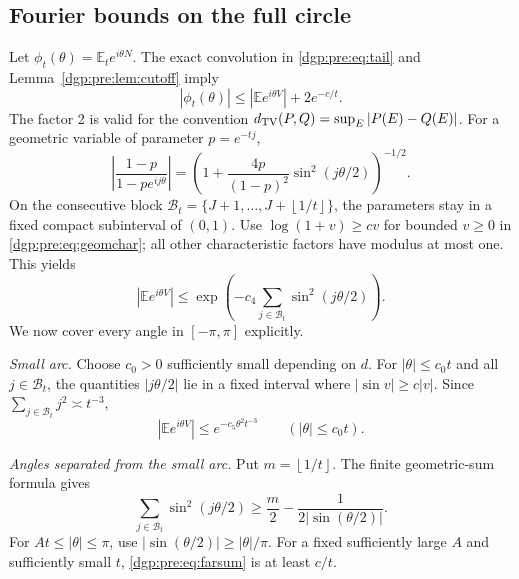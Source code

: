 \documentclass[11pt,letterpaper]{article}
\numberwithin{equation}{section}
\theoremstyle{remark}\newtheorem{remark}[theorem]{Remark}
\newcommand{\EE}{\mathbb E}
\newcommand{\floor}[1]{\left\lfloor #1\right\rfloor}
\begin{document}
\subsection{Fourier bounds on the full circle}
Let $\phi_t(\theta)=\EE_t e^{i\theta N}$. The exact convolution in
\eqref{dgp:pre:eq:tail} and Lemma~\ref{dgp:pre:lem:cutoff} imply
\begin{equation}
 |\phi_t(\theta)|\leq|\EE e^{i\theta V}|+2e^{-c/t}.
 \label{dgp:pre:eq:phicutoff}
\end{equation}
The factor 2 is valid for the convention
$d_{\rm TV}(P,Q)=\sup_E|P(E)-Q(E)|$.
For a geometric variable of parameter $p=e^{-tj}$,
\begin{equation}
 \left|\frac{1-p}{1-pe^{ij\theta}}\right|
 =\left(1+\frac{4p}{(1-p)^2}\sin^2(j\theta/2)\right)^{-1/2}.
 \label{dgp:pre:eq:geomchar}
\end{equation}
On the consecutive block $\mathcal B_t=\{J+1,\ldots,J+\floor{1/t}\}$,
the parameters stay in a fixed compact subinterval of $(0,1)$.
Use $\log(1+v)\geq c v$ for bounded $v\geq0$ in \eqref{dgp:pre:eq:geomchar};
all other characteristic factors have modulus at most one. This yields
\begin{equation}
 |\EE e^{i\theta V}|
 \leq\exp\left(-c_4\sum_{j\in\mathcal B_t}\sin^2(j\theta/2)\right).
 \label{dgp:pre:eq:sinbound}
\end{equation}
We now cover every angle in $[-\pi,\pi]$ explicitly.

\emph{Small arc.} Choose $c_0>0$ sufficiently small depending on $d$.
For $|\theta|\leq c_0t$ and all $j\in\mathcal B_t$, the quantities
$|j\theta/2|$ lie in a fixed interval where $|\sin v|\geq c|v|$.
Since $\sum_{j\in\mathcal B_t}j^2\asymp t^{-3}$,
\begin{equation}
 |\EE e^{i\theta V}|\leq e^{-c_5\theta^2t^{-3}}
       \qquad(|\theta|\leq c_0t).
 \label{dgp:pre:eq:smallarc}
\end{equation}

\emph{Angles separated from the small arc.} Put $m=\floor{1/t}$.
The finite geometric-sum formula gives
\begin{equation}
 \sum_{j\in\mathcal B_t}\sin^2(j\theta/2)
 \geq\frac m2-\frac1{2|\sin(\theta/2)|}.
 \label{dgp:pre:eq:farsum}
\end{equation}
For $At\leq|\theta|\leq\pi$, use
$|\sin(\theta/2)|\geq|\theta|/\pi$. For a fixed sufficiently large
$A$ and sufficiently small $t$, \eqref{dgp:pre:eq:farsum} is at least $c/t$.
\end{document}
